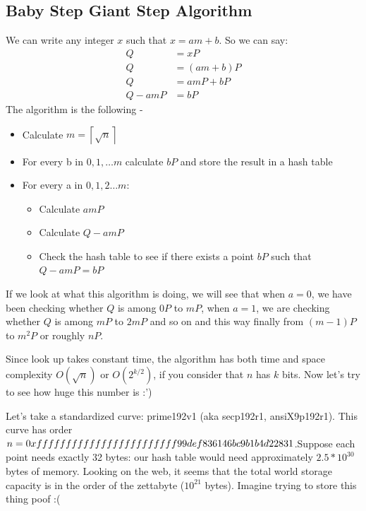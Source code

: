\documentclass[12pt,letterpaper]{article}
\begin{document}
\subsection{Baby Step Giant Step Algorithm}
We can write any integer $x$ such that $x=am+b$. So we can say:
\begin{align*}
  Q & = xP \\
  Q & = (am + b) P \\
  Q & = am P + b P \\
  Q - am P & = b P
\end{align*}
The algorithm is the following - 
\begin{itemize}
    \item Calculate $m = \left\lceil{\sqrt{n}}\right\rceil$
    \item For every b in $0,1,\dots m$ calculate $bP$ and store the result in a hash table
    \item For every a in $0,1,2\dots m$:
    \begin{itemize}
        \item Calculate $amP$
        \item Calculate $Q-amP$
        \item Check the hash table to see if there exists a point $bP$ such that $Q-amP=bP$
    \end{itemize}
\end{itemize}
If we look at what this algorithm is doing, we will see that when $a=0$, we have been checking whether $Q$ is among $0P$ to $mP$, when $a=1$, we are checking whether $Q$ is among $mP$ to $2mP$ and so on and this way finally from $(m-1)P$ to $m^2P$ or roughly $nP$.

Since look up takes constant time, the algorithm has both time and space complexity $O(\sqrt{n})$ or $O(2^{k/2})$, if you consider that $n$ has $k$ bits. Now let's try to see how huge this number is :')

Let's take a standardized curve: prime192v1 (aka secp192r1, ansiX9p192r1). This curve has order $n=0xffffffffffffffff ffffffff99def836146bc9b1\\b4d22831$.Suppose each point needs exactly 32 bytes: our hash table would need approximately $2.5*10^{30}$ bytes of memory. Looking on the web, it seems that the total world storage capacity is in the order of the zettabyte ($10^{21}$ bytes). Imagine trying to store this thing poof :(
\end{document}
